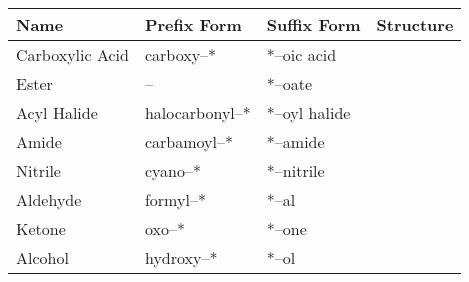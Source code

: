 		\begin{center}
		\begin{longtabu} to 0.9\textwidth { X[c,m] | X[c,m] | X[c,m] | X[c,m] }

		Name            &   Prefix Form     &   Suffix Form     &   Structure           \\ \hline
		Carboxylic Acid &   carboxy–*       &   *–oic acid      &
			\vspace{4mm}\vspace{4mm}
			\\ \hline

		Ester           &       –           &   *–oate          &
			\vspace{4mm}\vspace{4mm}
			\\ \hline

		Acyl Halide     &   halocarbonyl–*  &   *–oyl halide    &
			\vspace{4mm}\vspace{4mm}
			\\ \hline

		Amide           &   carbamoyl–*     &   *–amide         &
			\vspace{4mm}\vspace{4mm}
			\\ \hline

		Nitrile         &   cyano–*         &   *–nitrile       &
			\vspace{12mm}\vspace{12mm} %
			\\ \hline

		Aldehyde        &   formyl–*        &   *–al            &
			\vspace{4mm}\vspace{4mm}
			\\ \hline

		Ketone          &   oxo–*           &   *–one           &
			\vspace{4mm}\vspace{4mm}
			\\ \hline

		Alcohol         &   hydroxy–*       &   *–ol            &
			\vspace{4mm}\vspace{4mm}
			\\ \hline


\end{longtabu}
\end{center}

